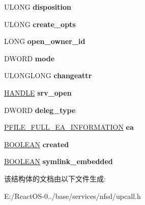 \begin{DoxyCompactItemize}
U\+L\+O\+NG {\bfseries disposition}
\item 
\mbox{\label{struct____open__upcall__args_ae28f0e4d79b29117be447fe8cb8b57e6}} 
U\+L\+O\+NG {\bfseries create\+\_\+opts}
\item 
\mbox{\label{struct____open__upcall__args_ae979ff32e4298698876dbd1e03a87828}} 
L\+O\+NG {\bfseries open\+\_\+owner\+\_\+id}
\item 
\mbox{\label{struct____open__upcall__args_a0c845eba309d6e74b9a605111f777209}} 
D\+W\+O\+RD {\bfseries mode}
\item 
\mbox{\label{struct____open__upcall__args_a6066d57084e917f0623fae2a7dcad7fe}} 
U\+L\+O\+N\+G\+L\+O\+NG {\bfseries changeattr}
\item 
\mbox{\label{struct____open__upcall__args_affb97745b45829911043887a8ec52327}} 
\hyperlink{interfacevoid}{H\+A\+N\+D\+LE} {\bfseries srv\+\_\+open}
\item 
\mbox{\label{struct____open__upcall__args_aa4084ff0d3fc9df33ce95f5d4e22c8b8}} 
D\+W\+O\+RD {\bfseries deleg\+\_\+type}
\item 
\mbox{\label{struct____open__upcall__args_afcde8de4fed1ef38d1baf5da4ea74946}} 
\hyperlink{struct___f_i_l_e___f_u_l_l___e_a___i_n_f_o_r_m_a_t_i_o_n}{P\+F\+I\+L\+E\+\_\+\+F\+U\+L\+L\+\_\+\+E\+A\+\_\+\+I\+N\+F\+O\+R\+M\+A\+T\+I\+ON} {\bfseries ea}
\item 
\mbox{\label{struct____open__upcall__args_a5d3d533dfd9322facef3e51526b58691}} 
\hyperlink{_processor_bind_8h_a112e3146cb38b6ee95e64d85842e380a}{B\+O\+O\+L\+E\+AN} {\bfseries created}
\item 
\mbox{\label{struct____open__upcall__args_a468fd741af091d9cbcdddfaa052925ea}} 
\hyperlink{_processor_bind_8h_a112e3146cb38b6ee95e64d85842e380a}{B\+O\+O\+L\+E\+AN} {\bfseries symlink\+\_\+embedded}
\end{DoxyCompactItemize}


该结构体的文档由以下文件生成\+:\begin{DoxyCompactItemize}
\item 
E\+:/\+React\+O\+S-\/0../base/services/nfsd/upcall.\+h\end{DoxyCompactItemize}
